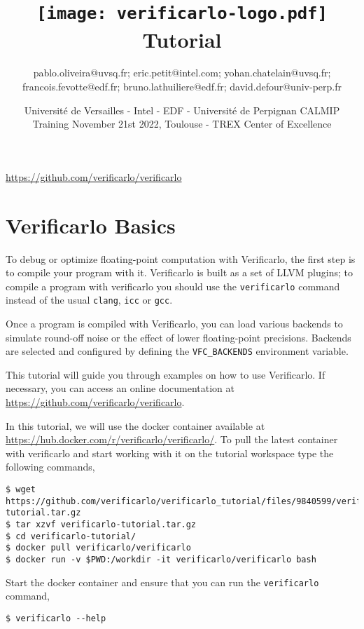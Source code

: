 \documentclass{TP}
\title{\texttt{[image: verificarlo-logo.pdf]}\\[4mm]
  Tutorial}
\author{pablo.oliveira@uvsq.fr; eric.petit@intel.com; yohan.chatelain@uvsq.fr;
  francois.fevotte@edf.fr; bruno.lathuiliere@edf.fr; david.defour@univ-perp.fr}
\date{Université de Versailles - Intel - EDF - Université de Perpignan\newline
      CALMIP Training November 21st 2022, Toulouse - TREX Center of Excellence
    }
\begin{document}
\maketitle

\centerline{\url{https://github.com/verificarlo/verificarlo}}
\tableofcontents


\section{Verificarlo Basics}

To debug or optimize floating-point computation with Verificarlo, the first
step is to compile your program with it. Verificarlo is built as a set of LLVM
plugins; to compile a program with verificarlo you should use the \texttt{verificarlo}
command instead of the usual \texttt{clang}, \texttt{icc} or \texttt{gcc}.

Once a program is compiled with Verificarlo, you can load various backends to
simulate round-off noise or the effect of lower floating-point precisions. Backends are selected and configured by defining the \texttt{VFC\_BACKENDS} environment variable.

This tutorial will guide you through examples on how to use Verificarlo.
If necessary, you can access an online documentation at \url{https://github.com/verificarlo/verificarlo}.

In this tutorial, we will use the docker container available at
\url{https://hub.docker.com/r/verificarlo/verificarlo/}.
To pull the latest container with verificarlo and start working with it on
the tutorial workspace type the following commands,
\begin{verbatim}
$ wget https://github.com/verificarlo/verificarlo_tutorial/files/9840599/verificarlo-tutorial.tar.gz
$ tar xzvf verificarlo-tutorial.tar.gz
$ cd verificarlo-tutorial/
$ docker pull verificarlo/verificarlo
$ docker run -v $PWD:/workdir -it verificarlo/verificarlo bash
\end{verbatim}

\begin{question}
  Start the docker container and ensure that you can run the \texttt{verificarlo} command,
  \begin{verbatim}
$ verificarlo --help
\end{verbatim}
\end{question}



\FloatBarrier


\FloatBarrier


\FloatBarrier



\FloatBarrier
\newpage


\end{document}
